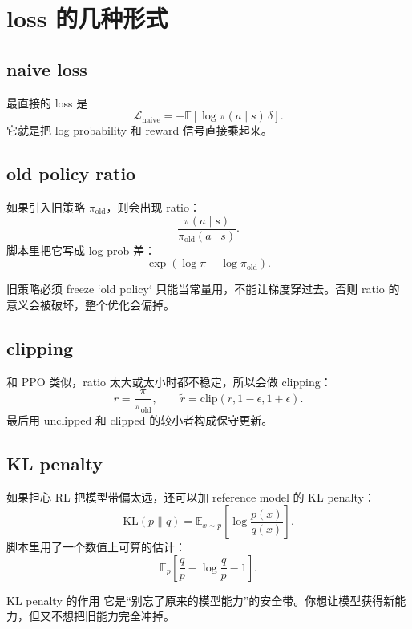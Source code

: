\documentclass[a4paper]{article}
\begin{document}
\section{loss 的几种形式}

\subsection{naive loss}

最直接的 loss 是
\[
\mathcal{L}_{\text{naive}} = -\mathbb{E}[\log \pi(a \mid s)\,\delta].
\]
它就是把 log probability 和 reward 信号直接乘起来。


\subsection{old policy ratio}

如果引入旧策略 $\pi_{\text{old}}$，则会出现 ratio：
\[
\frac{\pi(a\mid s)}{\pi_{\text{old}}(a\mid s)}.
\]
脚本里把它写成 log prob 差：
\[
\exp(\log \pi - \log \pi_{\text{old}}).
\]

\begin{warningbox}{旧策略必须 freeze}
`old policy` 只能当常量用，不能让梯度穿过去。否则 ratio 的意义会被破坏，整个优化会偏掉。
\end{warningbox}


\subsection{clipping}

和 PPO 类似，ratio 太大或太小时都不稳定，所以会做 clipping：
\[
r = \frac{\pi}{\pi_{\text{old}}}, \qquad
\tilde r = \mathrm{clip}(r, 1-\epsilon, 1+\epsilon).
\]
最后用 unclipped 和 clipped 的较小者构成保守更新。


\subsection{KL penalty}

如果担心 RL 把模型带偏太远，还可以加 reference model 的 KL penalty：
\[
\mathrm{KL}(p\|q) = \mathbb{E}_{x\sim p}\!\left[\log \frac{p(x)}{q(x)}\right].
\]
脚本里用了一个数值上可算的估计：
\[
\mathbb{E}_p\!\left[\frac{q}{p} - \log\frac{q}{p} - 1\right].
\]

\begin{importantbox}{KL penalty 的作用}
它是“别忘了原来的模型能力”的安全带。你想让模型获得新能力，但又不想把旧能力完全冲掉。
\end{importantbox}
\end{document}

